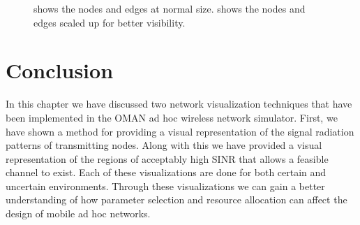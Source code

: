 \begin{figure}[ht]
\centering
{}
  \caption{ shows the nodes and edges at normal size.   shows the nodes and edges scaled up for better visibility.}
\label{fig:3d_terrain_node_scale}
\end{figure}

\section{Conclusion}
In this chapter we have discussed two network visualization techniques that have been implemented in the OMAN ad hoc wireless network simulator.  First, we have shown a method for providing a visual representation of the signal radiation patterns of transmitting nodes.  Along with this we have provided a visual representation of the regions of acceptably high SINR that allows a feasible channel to exist.  Each of these visualizations are done for both certain and uncertain environments.  Through these visualizations we can gain a better understanding of how parameter selection and resource allocation can affect the design of mobile ad hoc networks.

